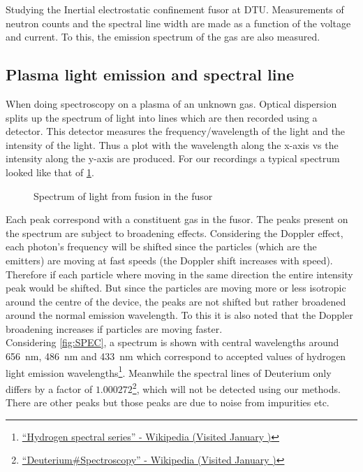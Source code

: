 Studying the Inertial electrostatic confinement fusor at DTU. Measurements of neutron counts and the spectral line width are made as a function of the voltage and current. To this, the emission spectrum of the gas are also measured.
\subsection{Plasma light emission and spectral line}
When doing spectroscopy on a plasma of an unknown gas. Optical dispersion splits up the spectrum of light into lines which are then recorded using a detector. This detector measures the frequency/wavelength of the light and the intensity of the light. Thus a plot with the wavelength along the x-axis vs the intensity along the y-axis are produced. For our recordings a typical spectrum looked like that of \cref{SPEC}.
\begin{figure}[H]
	\centering
	\caption{Spectrum of light from fusion in the fusor}
	\label{SPEC}
\end{figure}
Each peak correspond with a constituent gas in the fusor.
The peaks present on the spectrum are subject to broadening effects. Considering the Doppler effect, each photon's frequency will be shifted since the particles (which are the emitters) are moving at fast speeds (the Doppler shift increases with speed). Therefore if each particle where moving in the same direction the entire intensity peak would be shifted. But since the particles are moving more or less isotropic around the centre of the device, the peaks are not shifted but rather broadened around the normal emission wavelength. To this it is also noted that the Doppler broadening increases if particles are moving faster.\\
Considering \cref{fig:SPEC}, a spectrum is shown with central wavelengths around \SI{656}{\nano\meter}, \SI{486}{\nano\meter} and \SI{433}{\nano\meter} which correspond to accepted values of hydrogen light emission wavelengths\footnote{\href{https://en.wikipedia.org/wiki/Hydrogen_spectral_series}{``Hydrogen spectral series'' - Wikipedia (Visited January )}}. Meanwhile the spectral lines of Deuterium only differs by a factor of $1.000272$\footnote{\href{https://en.wikipedia.org/wiki/Deuterium#Spectroscopy}{``Deuterium\#Spectroscopy'' - Wikipedia (Visited January )}}, which will not be detected using our methods. There are other peaks but those peaks are due to noise from impurities etc.\\
